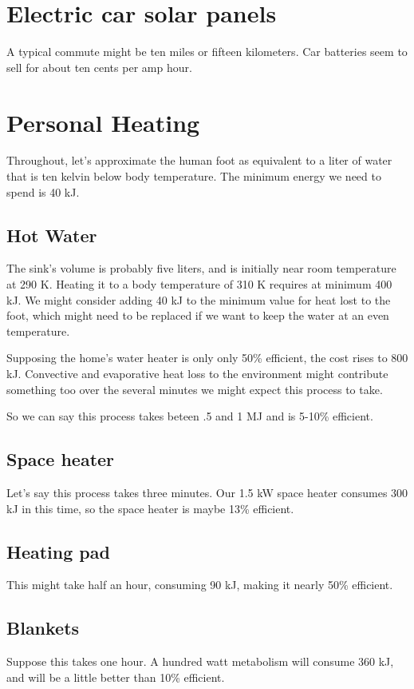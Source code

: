 \documentclass[12pt]{article}
\title{}
\author{}
\date{}
\begin{document}
\maketitle

\section{Electric car solar panels}

A typical commute might be ten miles or fifteen kilometers. Car batteries seem to sell for about ten cents per amp hour.


\section{Personal Heating}

Throughout, let's approximate the human foot as equivalent to a liter of water that is ten kelvin below body temperature. The minimum energy we need to spend is 40 kJ.

\subsection{Hot Water}

The sink's volume is probably five liters, and is initially near room temperature at 290 K. Heating it to a body temperature of 310 K requires at minimum 400 kJ. We might consider adding 40 kJ to the minimum value for heat lost to the foot, which might need to be replaced if we want to keep the water at an even temperature.

Supposing the home's water heater is only only 50\% efficient, the cost rises to 800 kJ. Convective and evaporative heat loss to the environment might contribute something too over the several minutes we might expect this process to take. 

So we can say this process takes beteen .5 and 1 MJ and is 5-10\% efficient.

\subsection{Space heater}

Let's say this process takes three minutes. Our 1.5 kW space heater consumes 300 kJ in this time, so the space heater is maybe 13\% efficient.

\subsection{Heating pad}

This might take half an hour, consuming 90 kJ, making it nearly 50\% efficient.

\subsection{Blankets}

Suppose this takes one hour. A hundred watt metabolism will consume 360 kJ, and will be a little better than 10\% efficient.
\end{document}
